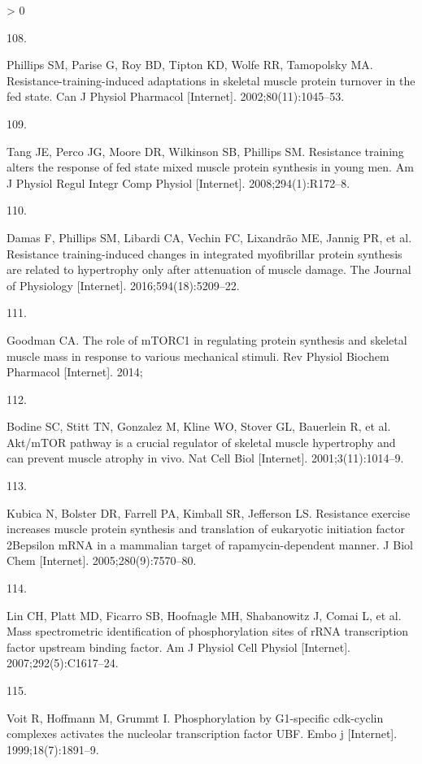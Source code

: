 \documentclass[twoside,10pt]{gihclass} %
\newlength{\cslhangindent}
\newlength{\csllabelwidth}
\newenvironment{CSLReferences}[3] %
 {%
  \setlength{\parindent}{0pt}
  \ifodd #1 \everypar{\setlength{\hangindent}{\cslhangindent}}\ignorespaces\fi
  \ifnum #2 > 0
  \setlength{\parskip}{#2\baselineskip}
  \fi
 }%
 {}
\newcommand{\CSLLeftMargin}[1]{\parbox[t]{\maxof{\widthof{#1}}{\csllabelwidth}}{#1}}
\newcommand{\CSLRightInline}[1]{\parbox[t]{\linewidth}{#1}}
\begin{document}
\begin{CSLReferences}{0}{0}
\leavevmode\hypertarget{ref-RN2724}{}%
\CSLLeftMargin{108. }
\CSLRightInline{Phillips SM, Parise G, Roy BD, Tipton KD, Wolfe RR, Tamopolsky MA. Resistance-training-induced adaptations in skeletal muscle protein turnover in the fed state. Can J Physiol Pharmacol {[}Internet{]}. 2002;80(11):1045--53. }

\leavevmode\hypertarget{ref-RN2723}{}%
\CSLLeftMargin{109. }
\CSLRightInline{Tang JE, Perco JG, Moore DR, Wilkinson SB, Phillips SM. Resistance training alters the response of fed state mixed muscle protein synthesis in young men. Am J Physiol Regul Integr Comp Physiol {[}Internet{]}. 2008;294(1):R172--8. }

\leavevmode\hypertarget{ref-RN2144}{}%
\CSLLeftMargin{110. }
\CSLRightInline{Damas F, Phillips SM, Libardi CA, Vechin FC, Lixandrão ME, Jannig PR, et al. Resistance training-induced changes in integrated myofibrillar protein synthesis are related to hypertrophy only after attenuation of muscle damage. The Journal of Physiology {[}Internet{]}. 2016;594(18):5209--22. }

\leavevmode\hypertarget{ref-RN1049}{}%
\CSLLeftMargin{111. }
\CSLRightInline{Goodman CA. The role of mTORC1 in regulating protein synthesis and skeletal muscle mass in response to various mechanical stimuli. Rev Physiol Biochem Pharmacol {[}Internet{]}. 2014; }

\leavevmode\hypertarget{ref-RN782}{}%
\CSLLeftMargin{112. }
\CSLRightInline{Bodine SC, Stitt TN, Gonzalez M, Kline WO, Stover GL, Bauerlein R, et al. Akt/mTOR pathway is a crucial regulator of skeletal muscle hypertrophy and can prevent muscle atrophy in vivo. Nat Cell Biol {[}Internet{]}. 2001;3(11):1014--9. }

\leavevmode\hypertarget{ref-RN860}{}%
\CSLLeftMargin{113. }
\CSLRightInline{Kubica N, Bolster DR, Farrell PA, Kimball SR, Jefferson LS. Resistance exercise increases muscle protein synthesis and translation of eukaryotic initiation factor 2Bepsilon mRNA in a mammalian target of rapamycin-dependent manner. J Biol Chem {[}Internet{]}. 2005;280(9):7570--80. }

\leavevmode\hypertarget{ref-RN2563}{}%
\CSLLeftMargin{114. }
\CSLRightInline{Lin CH, Platt MD, Ficarro SB, Hoofnagle MH, Shabanowitz J, Comai L, et al. Mass spectrometric identification of phosphorylation sites of rRNA transcription factor upstream binding factor. Am J Physiol Cell Physiol {[}Internet{]}. 2007;292(5):C1617--24. }

\leavevmode\hypertarget{ref-RN2602}{}%
\CSLLeftMargin{115. }
\CSLRightInline{Voit R, Hoffmann M, Grummt I. Phosphorylation by G1-specific cdk-cyclin complexes activates the nucleolar transcription factor UBF. Embo j {[}Internet{]}. 1999;18(7):1891--9. }


\end{CSLReferences}
\end{document}
